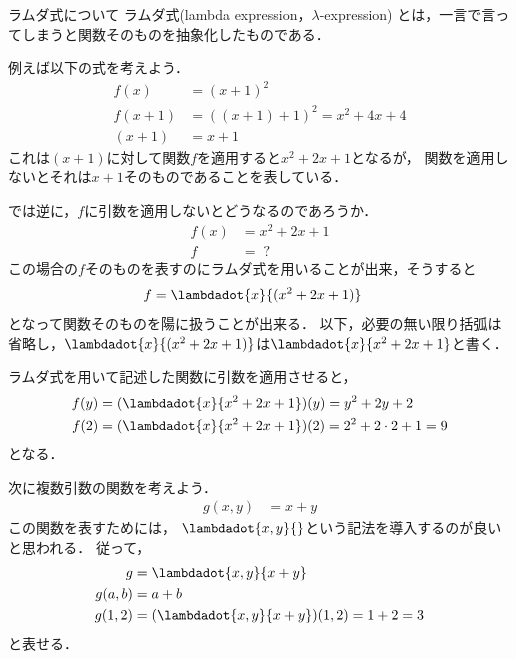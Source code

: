 \documentclass[a4paper,titlepage,report,disablejfam]{jsbook}
\begin{document}
\begin{resbonsiblesection}{ラムダ式について}{\sakamoto}\label{sc:about-lambda-expression}
ラムダ式(lambda expression，$\lambda$-expression) とは，一言で言ってしまうと関数そのものを抽象化したものである．

例えば以下の式を考えよう．
\begin{align}
f(x) &= (x + 1)^2\\
f(x + 1) &= {\left((x + 1) + 1\right)}^2 = x^2 + 4x + 4\\
(x + 1) &= x + 1
\end{align}
これは$(x + 1)$に対して関数$f$を適用すると$x^2 + 2x + 1$となるが，
関数を適用しないとそれは$x + 1$そのものであることを表している．

では逆に，$f$に引数を適用しないとどうなるのであろうか．
\begin{align}
f(x) &= x^2 + 2x + 1\\
f    &= \;?
\end{align}
この場合の$f$そのものを表すのにラムダ式を用いることが出来，そうすると
\begin{align}
f &= \lambdadot{x}{(x^2 + 2x + 1)}
\end{align}
となって関数そのものを陽に扱うことが出来る．
以下，必要の無い限り括弧は省略し，$\lambdadot{x}{(x^2 + 2x + 1)}$は$\lambdadot{x}{x^2 + 2x + 1}$と書く．

ラムダ式を用いて記述した関数に引数を適用させると，
\begin{align}
f(y) &= (\lambdadot{x}{x^2 + 2x + 1})(y) = y^2 + 2y + 2 \\
f(2) &= (\lambdadot{x}{x^2 + 2x + 1})(2) = 2^2 + 2\cdot 2 + 1 = 9
\end{align}
となる．

次に複数引数の関数を考えよう．
\begin{align}
g(x, y) &= x + y
\end{align}
この関数を表すためには，
$\lambdadot{x,y}{}$という記法を導入するのが良いと思われる．
従って，
\begin{align}
\label{eq:lambda-multiple}
g &= \lambdadot{x,y}{x + y}\\
\label{eq:lambda-multiple-inst}
g(a, b) &= a + b\\
g(1, 2) &= (\lambdadot{x,y}{x + y})(1, 2) = 1 + 2 = 3
\end{align}
と表せる．


\end{resbonsiblesection}
\end{document}
